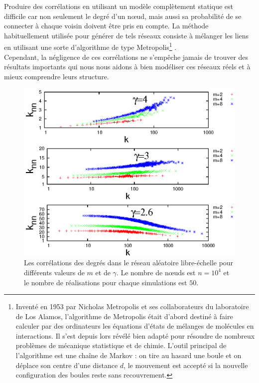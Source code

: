 Produire des corrélations en utilisant un modèle complètement statique est difficile car non seulement le degré d'un nœud, mais aussi sa probabilité de se connecter à chaque voisin doivent être pris en compte. La méthode habituellement utilisée pour générer de tels réseaux consiste à mélanger les liens en utilisant une sorte d'algorithme de type Metropolis\footnote{Inventé en 1953 par Nicholas Metropolis et ses collaborateurs du laboratoire de Los Alamos, l'algorithme de Metropolis était d'abord destiné à faire calculer par des ordinateurs les équations d'états de mélanges de molécules en interactions. Il s'est depuis lors révélé bien adapté pour résoudre de nombreux problèmes de mécanique statistique et de chimie. L'outil principal de l'algorithme est une chaîne de Markov : on tire au hasard une boule et on déplace son centre d'une distance $d$, le mouvement est accepté si la nouvelle configuration des boules reste sans recouvrement.} \cite{Metropolis-al1953}.\\ Cependant, la négligence de ces corrélations ne s'empêche jamais de trouver des résultats importants qui nous nous aidons à bien modéliser ces réseaux réels et à mieux comprendre leurs structure. 
\begin{figure}[h!]
	\centering
	\includegraphics[scale=1.2]{./figures/correlation}
	\caption{Les corrélations des degrés dans le réseau aléatoire libre-échelle pour différents valeurs de $m$ et de $\gamma$. Le nombre de nœuds est $n=10^4$ et le nombre de réalisations pour chaque simulations est $50$.}
	\label{correlation}
\end{figure}
\vspace{3cm}


